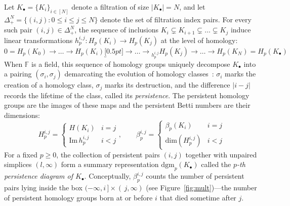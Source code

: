 Let $K_\bullet = \{K_i\}_{i\in [N]}$ denote a filtration of size $\lvert K_\bullet \rvert = N$, 
and let $\Delta_{+}^N = \{ (i,j) : 0 \leq i \leq j \leq N \}$ denote the set of filtration index pairs. 
For every such pair $(i,j) \in \Delta_{+}^N$, the sequence of inclusions $K_i \subsetneq K_{i+1} \subsetneq \dots \subsetneq K_j$ induce linear transformations $h_p^{i,j} :  H_p(K_i) \to H_p(K_j)$ at the level of homology:
\begin{equation}\label{eq:hom_map}
	0 = H_p(K_0) \to \dots \to H_p(K_i) \underbracket[0.5pt]{\to \dots \to}_{h_p^{i,j}} H_p(K_j) \to \dots \to H_p(K_N) = H_p(K_\bullet) 
\end{equation}
When $\mathbb{F}$ is a field, this sequence of homology groups uniquely decompose $K_\bullet$ into a pairing $(\sigma_i, \sigma_j)$ demarcating the evolution of homology classes~\cite{zomorodian2004computing}: $\sigma_i$ marks the creation of a homology class, $\sigma_j$ marks its destruction, and the difference $\lvert i - j \rvert$ records the lifetime of the class, called its \emph{persistence}.
The persistent homology groups are the images of these maps and the persistent Betti numbers are their dimensions:
\begin{equation}
	H_{p}^{i,j} = \begin{cases}
	H(K_i) & i = j \\ 
 	\mathrm{Im}\,h_p^{i,j} & i < j
 \end{cases}
, \quad \quad 
\beta_p^{i,j} = \begin{cases}
 	\beta_p(K_i) & i = j \\
 	\mathrm{dim}(H_{p}^{i,j}) & i < j
 \end{cases}
\end{equation}
For a fixed $p \geq 0$, the collection of persistent pairs $(i, j)$ together with unpaired simplices $(l, \infty)$ form a summary representation $\mathrm{dgm}_p(K_\bullet)$ called the \emph{$p$-th persistence diagram of $K_\bullet$}. Conceptually, $\beta_p^{i,j}$ counts the number of persistent pairs lying inside the box $(-\infty, i\,] \times (\,j, \infty)$ (see Figure~\ref{fig:mult})---the number of persistent homology groups born at or before $i$ that died sometime after $j$. 




